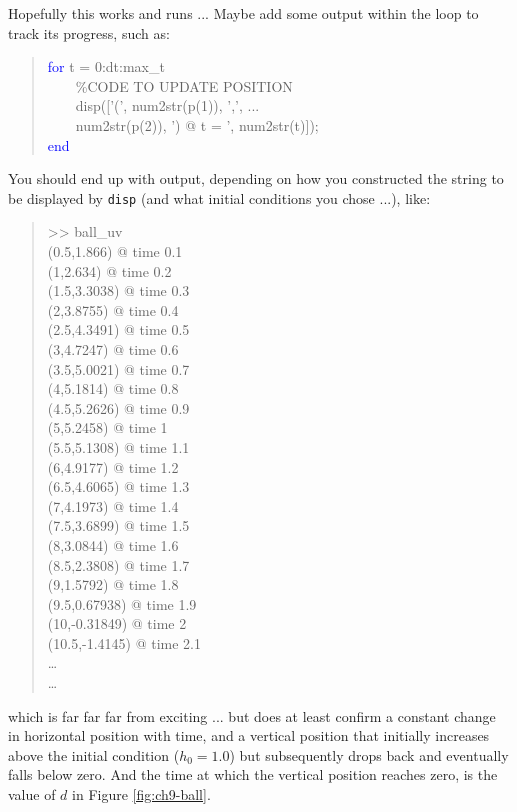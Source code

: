 \documentclass{tufte-book} %
\newenvironment{docspecmargin}{\begin{quotation}\ttfamily\footnotesize\parskip0pt\parindent0pt\ignorespaces}{\end{quotation}}
\begin{document}
Hopefully this works and runs ... Maybe add some output within the loop to track its progress, such as:
\begin{docspecmargin}
\textcolor{blue}{for} t = 0:dt:max\_t
\\ \ \ \ \ \textcolor[rgb]{0,0.501961,0}{\%CODE TO UPDATE POSITION}
\\ \ \ \ \ disp([\textcolor[rgb]{1,0,1}{'('}, num2str(p(1)), \textcolor[rgb]{1,0,1}{','}, ...
\\ \ \ \ \ num2str(p(2)), \textcolor[rgb]{1,0,1}{') @ t = '}, num2str(t)]);
\\\textcolor{blue}{end}
\end{docspecmargin}

You should end up with output, depending on how you constructed the string to be displayed by \texttt{disp} (and what initial conditions you chose ...), like:
\begin{docspecmargin}
>> ball\_uv
\\(0.5,1.866) @ time 0.1
\\(1,2.634) @ time 0.2
\\(1.5,3.3038) @ time 0.3
\\(2,3.8755) @ time 0.4
\\(2.5,4.3491) @ time 0.5
\\(3,4.7247) @ time 0.6
\\(3.5,5.0021) @ time 0.7
\\(4,5.1814) @ time 0.8
\\(4.5,5.2626) @ time 0.9
\\(5,5.2458) @ time 1
\\(5.5,5.1308) @ time 1.1
\\(6,4.9177) @ time 1.2
\\(6.5,4.6065) @ time 1.3
\\(7,4.1973) @ time 1.4
\\(7.5,3.6899) @ time 1.5
\\(8,3.0844) @ time 1.6
\\(8.5,2.3808) @ time 1.7
\\(9,1.5792) @ time 1.8
\\(9.5,0.67938) @ time 1.9
\\(10,-0.31849) @ time 2
\\(10.5,-1.4145) @ time 2.1
\\ \ldots 
\\ \ldots 
\end{docspecmargin}
which is far far far from exciting ... but does at least confirm a constant change in horizontal position with time, and a vertical position that initially increases above the initial condition (\(h_{0}=1.0\)) but subsequently drops back and eventually falls below zero. And the time at which the vertical position reaches zero, is the value of \(d\) in  Figure \ref{fig:ch9-ball}.
\end{document}
